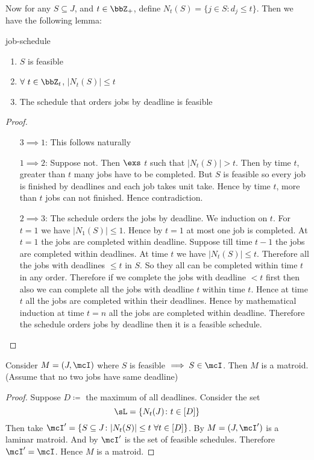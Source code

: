 Now  for any $S\subseteq J$, and $t\in\bbZ_+$, define $N_t(S)=\{j\in S\colon d_j\leq t\}$. Then we have the following lemma:
\begin{lemma}{}{job-schedule}
	\Tfae
	\begin{enumerate}[label=\bfseries\tiny\protect\circled{\small\arabic*}]
		\item $S$ is feasible
		\item $\forall\ t\in\bbZ_t$, $|N_t(S)|\leq t$
		\item The schedule that orders jobs by deadline is feasible
	\end{enumerate}
\end{lemma}
\begin{proof}

\begin{itemize}[wide]
	\item[$3\implies 1$:] This follows naturally
	\item[$1\implies 2$:] Suppose not. Then $\exs$ $t$ such that $|N_t(S)|>t$. Then by time $t$, greater than $t$ many jobs have to be completed. But  $S$ is feasible so every job is finished by deadlines and each job takes unit take. Hence by time $t$, more than $t$ jobs can not finished. Hence contradiction.
	\item[$2\implies 3$:] The schedule orders the jobs by deadline. We induction on $t$. For $t=1$ we have $|N_1(S)|\leq 1$. Hence by $t=1$ at most one job is completed. At $t=1$ the jobs are completed within deadline. Suppose till time $t-1$ the jobs are completed within deadlines. At time $t$ we have $|N_t(S)|\leq t$. Therefore all the jobs with deadlines $\leq t$ in $S$. So they all can be completed within time $t$ in any order. Therefore if we complete the jobs with deadline $<t$ first then also we can complete all the jobs with deadline $t$ within time $t$. Hence at time $t$ all the jobs are completed within their deadlines. Hence by mathematical induction at time $t=n$ all the jobs are completed within deadline. Therefore the schedule orders jobs by deadline then it is a feasible schedule.
\end{itemize}
\end{proof}
\begin{lemma}{}{}
	Consider $M=(J,\mcI)$ where $S$ is feasible $\implies S\in \mcI$. Then $M$ is a matroid. (Assume that no two jobs have same deadline)
\end{lemma}
\begin{proof}
	Suppose $D\coloneqq $ the maximum of all deadlines. Consider the set $$\sL=\{N_t(J)\colon t\in [D]\}$$Then take $\mcI'=\{S\subseteq J\colon |N_t(S)|\leq t\ \forall t\in [D]\}$. By  $M=(J,\mcI')$ is a laminar matroid. And by  $\mcI'$ is the set of feasible schedules. Therefore $\mcI'=\mcI$. Hence $M$ is a matroid.
\end{proof}
